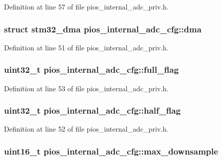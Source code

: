 \-Definition at line 57 of file pios\-\_\-internal\-\_\-adc\-\_\-priv.\-h.

\hypertarget{structpios__internal__adc__cfg_a1c8ede53f98b8d8eee4d4144a4104427}{
\subsubsection[{dma}]{\setlength{\rightskip}{0pt plus 5cm}struct {\bf stm32\-\_\-dma} {\bf pios\-\_\-internal\-\_\-adc\-\_\-cfg\-::dma}}}\label{structpios__internal__adc__cfg_a1c8ede53f98b8d8eee4d4144a4104427}


\-Definition at line 51 of file pios\-\_\-internal\-\_\-adc\-\_\-priv.\-h.

\hypertarget{structpios__internal__adc__cfg_aaf65057cc3e9e3db9c075162b8ecfe1b}{
\subsubsection[{full\-\_\-flag}]{\setlength{\rightskip}{0pt plus 5cm}uint32\-\_\-t {\bf pios\-\_\-internal\-\_\-adc\-\_\-cfg\-::full\-\_\-flag}}}\label{structpios__internal__adc__cfg_aaf65057cc3e9e3db9c075162b8ecfe1b}


\-Definition at line 53 of file pios\-\_\-internal\-\_\-adc\-\_\-priv.\-h.

\hypertarget{structpios__internal__adc__cfg_ade026429ab4238f63092fa17b4f95e4e}{
\subsubsection[{half\-\_\-flag}]{\setlength{\rightskip}{0pt plus 5cm}uint32\-\_\-t {\bf pios\-\_\-internal\-\_\-adc\-\_\-cfg\-::half\-\_\-flag}}}\label{structpios__internal__adc__cfg_ade026429ab4238f63092fa17b4f95e4e}


\-Definition at line 52 of file pios\-\_\-internal\-\_\-adc\-\_\-priv.\-h.

\hypertarget{structpios__internal__adc__cfg_ae647adbc83144e6f98ba7fb52ab72711}{
\subsubsection[{max\-\_\-downsample}]{\setlength{\rightskip}{0pt plus 5cm}uint16\-\_\-t {\bf pios\-\_\-internal\-\_\-adc\-\_\-cfg\-::max\-\_\-downsample}}}\label{structpios__internal__adc__cfg_ae647adbc83144e6f98ba7fb52ab72711}


